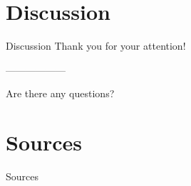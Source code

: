 \section*{Discussion}
\label{sec:discussion}

\begin{frame}{Discussion}
  \centering
  Thank you for your attention!

  ------------------

  Are there any questions?
\end{frame}

\section*{Sources}
\label{sec:sources}

\nocite{*}

\begin{frame}[shrink]{Sources}
  \printbibliography
\end{frame}
